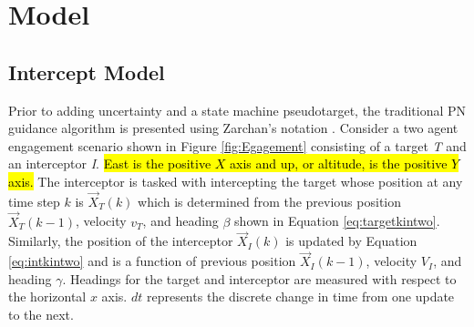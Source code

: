 \documentclass[conference]{IEEEtran}
\begin{document}
\section{Model}





\subsection{Intercept Model}
Prior to adding uncertainty and a state machine pseudotarget, the traditional PN guidance algorithm is presented using Zarchan's notation \cite{zarchan}. Consider a two agent engagement scenario shown in Figure \ref{fig:Egagement} consisting of a target \textit{T} and an interceptor \textit{I}. \hl{East is the positive $X$ axis and up, or altitude, is the positive $Y$ axis.} The interceptor is tasked with intercepting the target whose position at any time step $k$ is $\overrightarrow{X}_T(k)$ which is determined from the previous position $\overrightarrow{X}_T(k-1)$, velocity $v_T$, and heading $\beta$ shown in Equation \ref{eq:targetkintwo}. Similarly, the position of the interceptor $\overrightarrow{X}_I(k)$ is updated by Equation \ref{eq:intkintwo} and is a function of previous position $\overrightarrow{X}_I(k-1)$, velocity $V_I$, and heading $\gamma$. Headings for the target and interceptor are measured with respect to the horizontal $x$ axis. $dt$ represents the discrete change in time from one update to the next.

\end{document}
